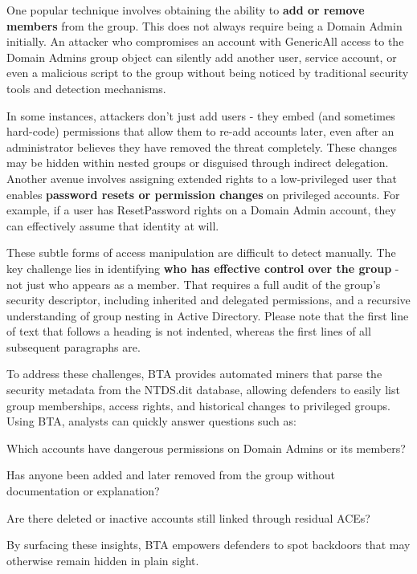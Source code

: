 One popular technique involves obtaining the ability to \textbf{add or remove members} from the group. This does not always require being a Domain Admin initially. An attacker who compromises an account with GenericAll access to the Domain Admins group object can silently add another user, service account, or even a malicious script to the group without being noticed by traditional security tools and detection mechanisms.

In some instances, attackers don't just add users - they embed (and sometimes hard-code) permissions that allow them to re-add accounts later, even after an administrator believes they have removed the threat completely. These changes may be hidden within nested groups or disguised through indirect delegation.
Another avenue involves assigning extended rights to a low-privileged user that enables \textbf{password resets or permission changes} on privileged accounts. For example, if a user has ResetPassword rights on a Domain Admin account, they can effectively assume that identity at will.

These subtle forms of access manipulation are difficult to detect manually. The key challenge lies in identifying \textbf{who has effective control over the group} - not just who appears as a member. That requires a full audit of the group's security descriptor, including inherited and delegated permissions, and a recursive understanding of group nesting in Active Directory.
Please note that the first line of text that follows a heading is not indented, whereas the first lines of all subsequent paragraphs are.

To address these challenges, BTA provides automated miners that parse the security metadata from the NTDS.dit database, allowing defenders to easily list group memberships, access rights, and historical changes to privileged groups. Using BTA, analysts can quickly answer questions such as:

    \item Which accounts have dangerous permissions on Domain Admins or its members?
    \item Has anyone been added and later removed from the group without documentation or explanation?
    \item Are there deleted or inactive accounts still linked through residual ACEs?

By surfacing these insights, BTA empowers defenders to spot backdoors that may otherwise remain hidden in plain sight. 

